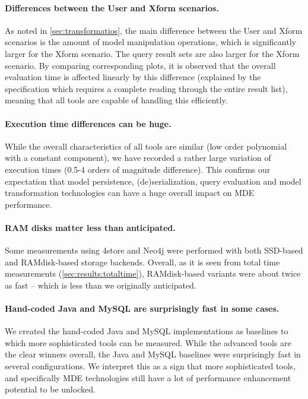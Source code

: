 \paragraph{Differences between the User and Xform scenarios.}
As noted in \autoref{sec:transformatios}, the main difference between the \textsf{User} and \textsf{Xform} scenarios is the amount of model manipulation operations, which is significantly larger for the \textsf{Xform} scenario. The query result sets are also larger for the \textsf{Xform} scenario. By comparing corresponding plots, it is observed that the overall evaluation time is affected linearly by this difference (explained by the specification which requires a complete reading through the entire result list), meaning that all tools are capable of handling this efficiently.

\paragraph{Execution time differences can be huge.}
While the overall characteristics of all tools are similar (low order polynomial with a constant component), we have recorded a rather large variation of execution times (0.5-4 orders of magnitude difference). This confirms our expectation that model persistence, (de)serialization, query evaluation and model transformation technologies can have a huge overall impact on MDE performance. 

\paragraph{RAM disks matter less than anticipated.}
Some measurements using 4store and Neo4j were performed with both SSD-based and RAMdisk-based storage backends. Overall, as it is seen from total time measurements (\autoref{sec:results:totaltime}), RAMdisk-based variants were about twice as fast -- which is less than we originally anticipated.

\paragraph{Hand-coded Java and MySQL are surprisingly fast in some cases.}
We created the hand-coded Java and MySQL implementations as baselines to which more sophisticated tools can be measured. While the advanced tools are the clear winners overall, the Java and MySQL baselines were surprisingly fast in several configurations. We interpret this as a sign that more sophisticated tools, and specifically MDE technologies still have a lot of performance enhancement potential to be unlocked.

